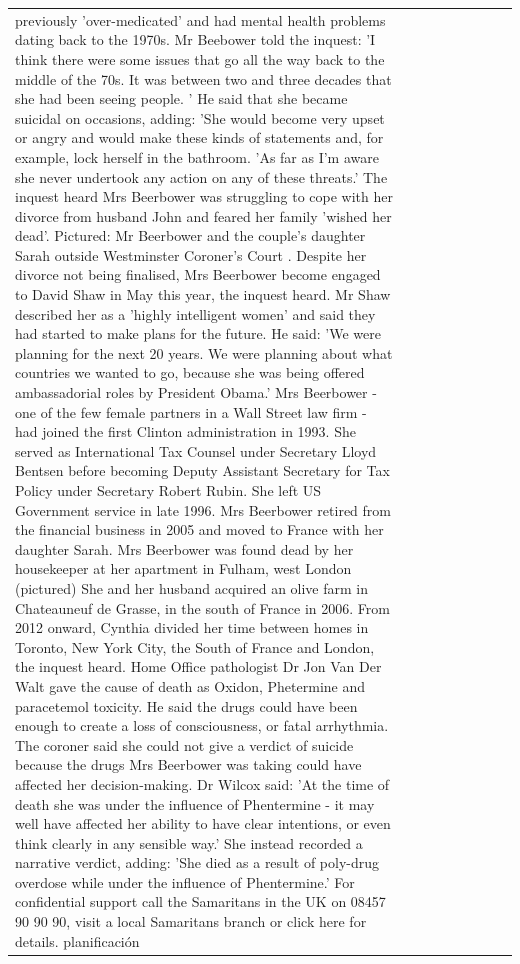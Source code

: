 \begin{table}[H]
\begin{tabular}{lllrlllll}
previously 'over-medicated' and had mental health problems dating back to the 1970s. Mr Beebower told the inquest: 'I think there were some issues that go all the way back to the middle of the 70s. It was between two and three decades that she had been seeing people. ' He said that she became suicidal on occasions, adding: 'She would become very upset or angry and would make these kinds of statements and, for example, lock herself in the bathroom. 'As far as I'm aware she never undertook any action on any of these threats.' The inquest heard Mrs Beerbower was struggling to cope with her divorce from husband John and feared her family 'wished her dead'. Pictured: Mr Beerbower and the couple's daughter Sarah outside Westminster Coroner's Court . Despite her divorce not being finalised, Mrs Beerbower become engaged to David Shaw in May this year, the inquest heard. Mr Shaw described her as a 'highly intelligent women' and said they had started to make plans for the future. He said: 'We were planning for the next 20 years. We were planning about what countries we wanted to go, because she was being offered ambassadorial roles by President Obama.' Mrs Beerbower - one of the few female partners in a Wall Street law firm - had joined the first Clinton administration in 1993. She served as International Tax Counsel under Secretary Lloyd Bentsen before becoming Deputy Assistant Secretary for Tax Policy under Secretary Robert Rubin. She left US Government service in late 1996. Mrs Beerbower retired from the financial business in 2005 and moved to France with her daughter Sarah. Mrs Beerbower was found dead by her housekeeper at her apartment in Fulham, west London (pictured) She and her husband acquired an olive farm in Chateauneuf de Grasse, in the south of France in 2006. From 2012 onward, Cynthia divided her time between homes in Toronto, New York City, the South of France and London, the inquest heard. Home Office pathologist Dr Jon Van Der Walt gave the cause of death as Oxidon, Phetermine and paracetemol toxicity. He said the drugs could have been enough to create a loss of consciousness, or fatal arrhythmia. The coroner said she could not give a verdict of suicide because the drugs Mrs Beerbower was taking could have affected her decision-making. Dr Wilcox said: 'At the time of death she was under the influence of Phentermine - it may well have affected her ability to have clear intentions, or even think clearly in any sensible way.' She instead recorded a narrative verdict, adding: 'She died as a result of poly-drug overdose while under the influence of Phentermine.' For confidential support call the Samaritans in the UK on 08457 90 90 90, visit a local Samaritans branch or click here for details. planificación \\

\end{tabular}
\end{table}
